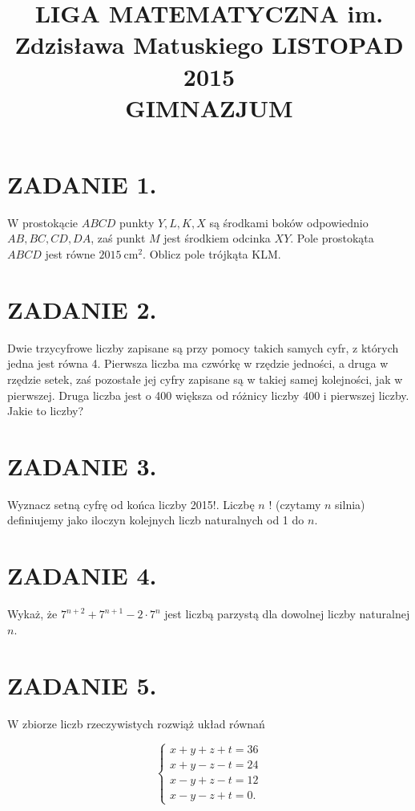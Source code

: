 \documentclass[10pt]{article}
\title{LIGA MATEMATYCZNA im. Zdzisława Matuskiego LISTOPAD 2015 \\
 GIMNAZJUM }
\author{}
\date{}
\begin{document}
\maketitle
\section*{ZADANIE 1.}
W prostokącie \(A B C D\) punkty \(Y, L, K, X\) są środkami boków odpowiednio \(A B, B C, C D, D A\), zaś punkt \(M\) jest środkiem odcinka \(X Y\). Pole prostokąta \(A B C D\) jest równe \(2015 \mathrm{~cm}^{2}\). Oblicz pole trójkąta KLM.

\section*{ZADANIE 2.}
Dwie trzycyfrowe liczby zapisane są przy pomocy takich samych cyfr, z których jedna jest równa 4. Pierwsza liczba ma czwórkę w rzędzie jedności, a druga w rzędzie setek, zaś pozostałe jej cyfry zapisane są w takiej samej kolejności, jak w pierwszej. Druga liczba jest o 400 większa od różnicy liczby 400 i pierwszej liczby. Jakie to liczby?

\section*{ZADANIE 3.}
Wyznacz setną cyfrę od końca liczby 2015!. Liczbę \(n\) ! (czytamy \(n\) silnia) definiujemy jako iloczyn kolejnych liczb naturalnych od 1 do \(n\).

\section*{ZADANIE 4.}
Wykaż, że \(7^{n+2}+7^{n+1}-2 \cdot 7^{n}\) jest liczbą parzystą dla dowolnej liczby naturalnej \(n\).

\section*{ZADANIE 5.}
W zbiorze liczb rzeczywistych rozwiąż układ równań

\[
\left\{\begin{array}{l}
x+y+z+t=36 \\
x+y-z-t=24 \\
x-y+z-t=12 \\
x-y-z+t=0 .
\end{array}\right.
\]
\end{document}
